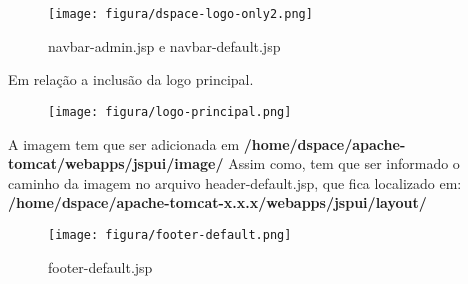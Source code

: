 \documentclass[12pt,hidelinks]{article}
\begin{document}
\begin{figure}[!htp]
        \centering
        \texttt{[image: figura/dspace-logo-only2.png]}
        \caption{navbar-admin.jsp e navbar-default.jsp}
        \label{Rotulo}
    \end{figure}

Em relação a inclusão da logo principal.
\begin{figure}[!htp]
        \centering
        \texttt{[image: figura/logo-principal.png]}
        \caption{}
        \label{Rotulo}
    \end{figure}
    
\newpage 
A imagem tem que ser adicionada em \textbf{/home/dspace/apache-tomcat/webapps/jspui/image/} 
Assim como, tem que ser informado o caminho da imagem no arquivo header-default.jsp, que fica localizado em:  \textbf{/home/dspace/apache-tomcat-x.x.x/webapps/jspui/layout/}
    \begin{figure}[!htp]
        \centering
        \texttt{[image: figura/footer-default.png]}
        \caption{footer-default.jsp}
        \label{Rotulo}
    \end{figure}
    
\end{document}
